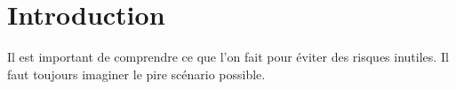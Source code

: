 \section{Introduction}
Il est important de comprendre ce que l'on fait pour \'eviter des risques inutiles. Il faut toujours imaginer le pire
sc\'enario possible.
